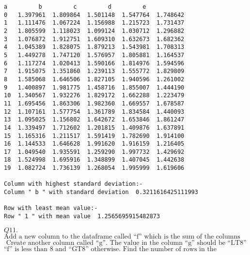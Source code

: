 \documentclass[11pt]{article}
\begin{document}
    \begin{Verbatim}[commandchars=\\\{\}]
           a         b         c         d         e
0   1.397961  1.809864  1.501148  1.547764  1.748642
1   1.111476  1.067224  1.156988  1.215723  1.731437
2   1.805599  1.118023  1.099124  1.030712  1.296882
3   1.076872  1.912751  1.609310  1.632673  1.682362
4   1.045389  1.828075  1.879213  1.543981  1.708313
5   1.449278  1.747120  1.576957  1.805881  1.164537
6   1.117274  1.020413  1.590166  1.814976  1.594596
7   1.915075  1.351860  1.239113  1.555772  1.829809
8   1.585068  1.646506  1.827105  1.940596  1.261002
9   1.400897  1.981775  1.458716  1.855007  1.444190
10  1.340567  1.932276  1.829172  1.662288  1.223479
11  1.695456  1.863306  1.982360  1.669557  1.678587
12  1.107161  1.577754  1.361789  1.834584  1.440093
13  1.095025  1.156802  1.642672  1.653846  1.861247
14  1.339497  1.712602  1.201815  1.409876  1.637891
15  1.165316  1.211517  1.591419  1.782690  1.914100
16  1.144533  1.646628  1.991620  1.916159  1.216405
17  1.049540  1.935591  1.259290  1.997732  1.429692
18  1.524998  1.695916  1.348899  1.407045  1.442638
19  1.082724  1.736139  1.268054  1.995999  1.619606

Column with highest standard deviation:-
Column " b " with standard deviation  0.3211616425111993

Row with least mean value:-
Row " 1 " with mean value  1.2565695915482873
    \end{Verbatim}

    \(Q11.\)
\(\text{Add a new column to the dataframe called “f” which is the sum of the columns “a”, “b”, “c”, “d”, “e”. }\)
\(\text{ Create another column called “g”. The value in the column “g” should be “LT8” if the value in the column }\)
\(\text{“f” is less than 8 and “GT8” otherwise. Find the number of rows in the dataframe where the value in the }\)\\\\
\end{document}
